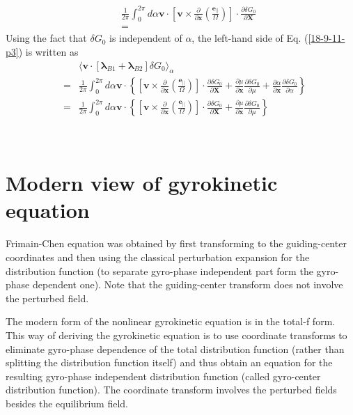 \documentclass{article}
\newcommand{\tmmathbf}[1]{\ensuremath{\boldsymbol{#1}}}
\begin{document}
\begin{eqnarray*}
  &  & \frac{1}{2 \pi} \int_0^{2 \pi} d \alpha \mathbf{v} \cdot \left[
  \mathbf{v} \times \frac{\partial}{\partial \mathbf{x}} \left(
  \frac{\tmmathbf{e}_{\parallel}}{\Omega} \right) \right] \cdot \frac{\partial
  \delta G_0}{\partial \mathbf{X}}\\
  &  & =
\end{eqnarray*}
Using the fact that $\delta G_0$ is independent of $\alpha$, the left-hand
side of Eq. (\ref{18-9-11-p3}) is written as
\begin{eqnarray*}
  &  & \langle \mathbf{v} \cdot [\tmmathbf{\lambda}_{B 1}
  +\tmmathbf{\lambda}_{B 2}] \delta G_0 \rangle_{\alpha}\\
  & = & \frac{1}{2 \pi} \int_0^{2 \pi} d \alpha \mathbf{v} \cdot \left\{
  \left[ \mathbf{v} \times \frac{\partial}{\partial \mathbf{x}} \left(
  \frac{\tmmathbf{e}_{\parallel}}{\Omega} \right) \right] \cdot \frac{\partial
  \delta G_0}{\partial \mathbf{X}} + \frac{\partial \mu}{\partial \mathbf{x}} 
  \frac{\partial \delta G_0}{\partial \mu} + \frac{\partial \alpha}{\partial
  \mathbf{x}}  \frac{\partial \delta G_0}{\partial \alpha} \right\}\\
  & = & \frac{1}{2 \pi} \int_0^{2 \pi} d \alpha \mathbf{v} \cdot \left\{
  \left[ \mathbf{v} \times \frac{\partial}{\partial \mathbf{x}} \left(
  \frac{\tmmathbf{e}_{\parallel}}{\Omega} \right) \right] \cdot \frac{\partial
  \delta G_0}{\partial \mathbf{X}} + \frac{\partial \mu}{\partial \mathbf{x}} 
  \frac{\partial \delta G_0}{\partial \mu} \right\}
\end{eqnarray*}


\

\section{Modern view of gyrokinetic equation}

Frimain-Chen equation was obtained by first transforming to the guiding-center
coordinates and then using the classical perturbation expansion for the
distribution function (to separate gyro-phase independent part form the
gyro-phase dependent one). Note that the guiding-center transform does not
involve the perturbed field.

The modern form of the nonlinear gyrokinetic equation is in the total-f form.
This way of deriving the gyrokinetic equation is to use coordinate transforms
to eliminate gyro-phase dependence of the total distribution function (rather
than splitting the distribution function itself) and thus obtain an equation
for the resulting gyro-phase independent distribution function (called
gyro-center distribution function). The coordinate transform involves the
perturbed fields besides the equilibrium field.
\end{document}
